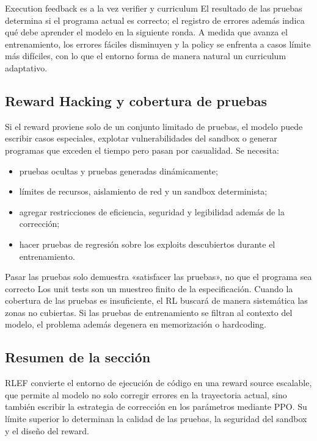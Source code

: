 \begin{importantbox}{Execution feedback es a la vez verifier y curriculum}
El resultado de las pruebas determina si el programa actual es correcto; el registro de errores además indica qué debe aprender el modelo en la siguiente ronda. A medida que avanza el entrenamiento, los errores fáciles disminuyen y la policy se enfrenta a casos límite más difíciles, con lo que el entorno forma de manera natural un curriculum adaptativo.
\end{importantbox}

\subsection{Reward Hacking y cobertura de pruebas}

Si el reward proviene solo de un conjunto limitado de pruebas, el modelo puede escribir casos especiales, explotar vulnerabilidades del sandbox o generar programas que exceden el tiempo pero pasan por casualidad. Se necesita:

\begin{itemize}
    \item pruebas ocultas y pruebas generadas dinámicamente;
    \item límites de recursos, aislamiento de red y un sandbox determinista;
    \item agregar restricciones de eficiencia, seguridad y legibilidad además de la corrección;
    \item hacer pruebas de regresión sobre los exploits descubiertos durante el entrenamiento.
\end{itemize}

\begin{warningbox}{Pasar las pruebas solo demuestra «satisfacer las pruebas», no que el programa sea correcto}
Los unit tests son un muestreo finito de la especificación. Cuando la cobertura de las pruebas es insuficiente, el RL buscará de manera sistemática las zonas no cubiertas. Si las pruebas de entrenamiento se filtran al contexto del modelo, el problema además degenera en memorización o hardcoding.
\end{warningbox}

\subsection{Resumen de la sección}

RLEF convierte el entorno de ejecución de código en una reward source escalable, que permite al modelo no solo corregir errores en la trayectoria actual, sino también escribir la estrategia de corrección en los parámetros mediante PPO. Su límite superior lo determinan la calidad de las pruebas, la seguridad del sandbox y el diseño del reward.
